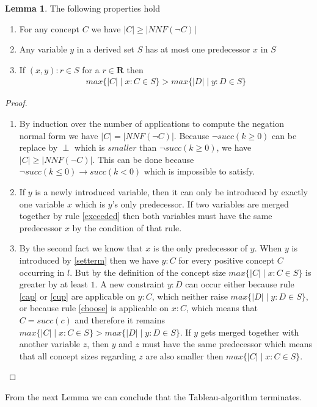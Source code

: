 \documentclass[a4paper,11pt]{scrartcl}
\theoremstyle{break}
\theoremstyle{definition}
\newtheorem{mylem}{Lemma}
\begin{document}
\begin{mylem}
The following properties hold
\begin{enumerate}
\item For any concept $C$ we have $|C|\geq|NNF(\neg C)|$
\item Any variable $y$ in a derived set $S$ has at most one predecessor $x$ in $S$
\item If $(x,y):r\in S$ for a $r\in\mathbf{R}$ then 
\begin{align*}
max\{|C|\mid x:C\in S\}>max\{|D|\mid y:D \in S\}
\end{align*}
\end{enumerate}
\end{mylem}
\begin{proof}$ $\\
\vspace*{-5mm}
\begin{enumerate}
\item By induction over the number of applications to compute the negation normal form we have $|C|=|NNF(\neg C)|$. Because $\neg succ(k\geq0)$ can be replace by $\perp$ which is $smaller$ than $\neg succ(k\geq 0)$, we have $|C|\geq|NNF(\neg C)|$. This can be done because $\neg succ(k\leq 0)\rightarrow succ(k<0)$ which is impossible to satisfy.
\item If $y$ is a newly introduced variable, then it can only be introduced by exactly one variable $x$ which is $y$'s only predecessor. If two variables are merged together by rule \ref{exceeded} then both variables must have the same predecessor $x$ by the condition of that rule.
\item By the second fact we know that $x$ is the only predecessor of $y$. When $y$ is introduced by \ref{setterm} then we have $y:C$ for every positive concept $C$ occurring in $l$. But by the definition of the concept size $max\{|C|\mid x:C\in S\}$ is greater by at least $1$. A new constraint $y:D$ can occur either because rule \ref{cap} or \ref{cup} are applicable on $y:C$, which neither raise $max\{|D|\mid y:D \in S\}$, or because rule \ref{choose} is applicable on $x:C$, which means that $C=succ(c)$ and therefore it remains $max\{|C|\mid x:C\in S\}>max\{|D|\mid y:D \in S\}$. If $y$ gets merged together with another variable $z$, then $y$ and $z$ must have the same predecessor which means that all concept sizes regarding $z$ are also smaller then $max\{|C|\mid x:C\in S\}$.
\end{enumerate}
\end{proof}
From the next Lemma we can conclude that the Tableau-algorithm terminates.
\end{document}
